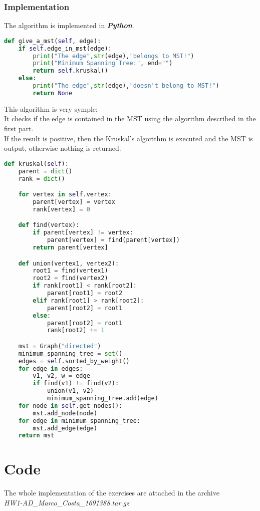 \documentclass[11pt]{article}
\begin{document}
\subsubsection{Implementation}
The algorithm is implemented in \textit{\textbf{Python}}.
\begin{lstlisting}[language=Python, caption=MST given an edge]
def give_a_mst(self, edge):
	if self.edge_in_mst(edge):
		print("The edge",str(edge),"belongs to MST!")
		print("Minimum Spanning Tree:", end="")
		return self.kruskal()
	else:
		print("The edge",str(edge),"doesn't belong to MST!")
		return None
\end{lstlisting}
This algorithm is very symple: \\
It checks if the edge is contained in the MST using the algorithm described in the first part.\\
If the result is positive, then the Kruskal's algorithm is executed and the MST is output, otherwise nothing is returned.

\begin{lstlisting}[language=Python, caption=Kruskal's algorithm]
def kruskal(self):
	parent = dict()
	rank = dict()

	for vertex in self.vertex:
		parent[vertex] = vertex
		rank[vertex] = 0

	def find(vertex):
		if parent[vertex] != vertex:
			parent[vertex] = find(parent[vertex])
		return parent[vertex]

	def union(vertex1, vertex2):
		root1 = find(vertex1)
		root2 = find(vertex2)
		if rank[root1] < rank[root2]:
			parent[root1] = root2
		elif rank[root1] > rank[root2]:
			parent[root2] = root1
		else:
			parent[root2] = root1
			rank[root2] += 1

	mst = Graph("directed")
	minimum_spanning_tree = set()
	edges = self.sorted_by_weight()
	for edge in edges:
		v1, v2, w = edge
		if find(v1) != find(v2):
			union(v1, v2)
			minimum_spanning_tree.add(edge)
	for node in self.get_nodes():
		mst.add_node(node)
	for edge in minimum_spanning_tree:
		mst.add_edge(edge)
	return mst
\end{lstlisting}

\appendix
\section{Code}
The whole implementation of the exercises are attached in the archive \\ \textit{HW1-AD\_Marco\_Costa\_1691388.tar.gz}
\end{document}
